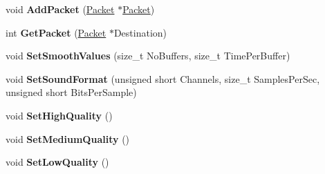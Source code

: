 \begin{DoxyCompactItemize}
\item 
\hypertarget{classcl_input_device_a5fc9c8758d42638ac542a470f6f8f990}{
void {\bfseries AddPacket} (\hyperlink{class_packet}{Packet} $\ast$\hyperlink{class_packet}{Packet})}
\label{classcl_input_device_a5fc9c8758d42638ac542a470f6f8f990}

\item 
\hypertarget{classcl_input_device_a57d074ac4d4145db43b7e49b0ba8d6f7}{
int {\bfseries GetPacket} (\hyperlink{class_packet}{Packet} $\ast$Destination)}
\label{classcl_input_device_a57d074ac4d4145db43b7e49b0ba8d6f7}

\item 
\hypertarget{classcl_input_device_aa72ddce4bfef1405e7a4ec7e27e47397}{
void {\bfseries SetSmoothValues} (size\_\-t NoBuffers, size\_\-t TimePerBuffer)}
\label{classcl_input_device_aa72ddce4bfef1405e7a4ec7e27e47397}

\item 
\hypertarget{classcl_input_device_a85bb9dac793e6dbbffd8fe8d9f18c2c2}{
void {\bfseries SetSoundFormat} (unsigned short Channels, size\_\-t SamplesPerSec, unsigned short BitsPerSample)}
\label{classcl_input_device_a85bb9dac793e6dbbffd8fe8d9f18c2c2}

\item 
\hypertarget{classcl_input_device_afd45228e27ed0f791ffea19536f88a3b}{
void {\bfseries SetHighQuality} ()}
\label{classcl_input_device_afd45228e27ed0f791ffea19536f88a3b}

\item 
\hypertarget{classcl_input_device_a1f2075861ff1d0692553977053200042}{
void {\bfseries SetMediumQuality} ()}
\label{classcl_input_device_a1f2075861ff1d0692553977053200042}

\item 
\hypertarget{classcl_input_device_a451a8c70f9c620a1ca737214db6fc557}{
void {\bfseries SetLowQuality} ()}
\label{classcl_input_device_a451a8c70f9c620a1ca737214db6fc557}

\end{DoxyCompactItemize}
